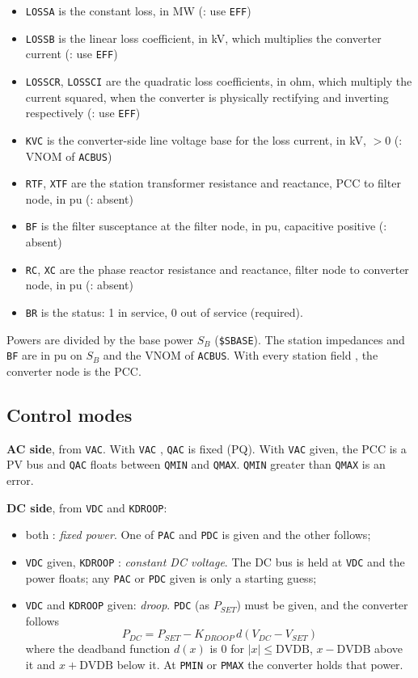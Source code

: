\begin{itemize}
\item {\tt LOSSA} is the constant loss, in MW ({\tt *}: use {\tt EFF})
\item {\tt LOSSB} is the linear loss coefficient, in kV, which multiplies the converter current ({\tt *}: use {\tt EFF})
\item {\tt LOSSCR}, {\tt LOSSCI} are the quadratic loss coefficients, in ohm, which multiply the current squared, when the converter is physically rectifying and inverting respectively ({\tt *}: use {\tt EFF})
\item {\tt KVC} is the converter-side line voltage base for the loss current, in kV, $> 0$ ({\tt *}: VNOM of {\tt ACBUS})
\item {\tt RTF}, {\tt XTF} are the station transformer resistance and reactance, PCC to filter node, in pu ({\tt *}: absent)
\item {\tt BF} is the filter susceptance at the filter node, in pu, capacitive positive ({\tt *}: absent)
\item {\tt RC}, {\tt XC} are the phase reactor resistance and reactance, filter node to converter node, in pu ({\tt *}: absent)
\item {\tt BR} is the status: 1 in service, 0 out of service (required).
\end{itemize}

Powers are divided by the base power $S_B$ ({\tt \$SBASE}). The station impedances and {\tt BF} are in pu on $S_B$ and the VNOM of {\tt ACBUS}. With every station field {\tt *}, the converter node is the PCC.

\subsection{Control modes}

{\bf AC side}, from {\tt VAC}. With {\tt VAC} {\tt *}, {\tt QAC} is fixed (PQ). With {\tt VAC} given, the PCC is a PV bus and {\tt QAC} floats between {\tt QMIN} and {\tt QMAX}. {\tt QMIN} greater than {\tt QMAX} is an error.

{\bf DC side}, from {\tt VDC} and {\tt KDROOP}:
\begin{itemize}
\item both {\tt *}: {\sl fixed power}. One of {\tt PAC} and {\tt PDC} is given and the other follows;
\item {\tt VDC} given, {\tt KDROOP} {\tt *}: {\sl constant DC voltage}. The DC bus is held at {\tt VDC} and the power floats; any {\tt PAC} or {\tt PDC} given is only a starting guess;
\item {\tt VDC} and {\tt KDROOP} given: {\sl droop}. {\tt PDC} (as $P_{SET}$) must be given, and the converter follows
\begin{equation}
P_{DC} = P_{SET} - K_{DROOP}\, d(V_{DC} - V_{SET})
\end{equation}
where the deadband function $d(x)$ is $0$ for $|x| \le \mbox{DVDB}$, $x - \mbox{DVDB}$ above it and $x + \mbox{DVDB}$ below it. At {\tt PMIN} or {\tt PMAX} the converter holds that power.
\end{itemize}

